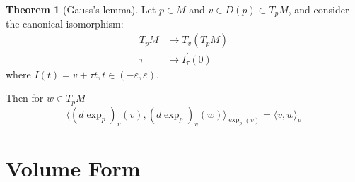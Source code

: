 \documentclass[12pt,a4paper]{book}
\newcommand{\p}{^{\prime}}
\theoremstyle{definition}
\newtheorem{theo}[defn]{Theorem}
\begin{document}
\begin{theo}[Gauss's lemma]
    Let $p\in M$ and $v\in D(p)\subset T_p M$, and consider the canonical isomorphism:
    \begin{align*}
        T_pM & \rightarrow T_v(T_pM) \\
        \tau & \mapsto I_{\tau}\p(0)
    \end{align*}
    where $I(t)=v+\tau t,t\in (-\varepsilon,\varepsilon)$.

    Then for $w\in T_pM$
    \begin{equation*}
        \langle (d\exp_p)_v(v),(d\exp_p)_v(w) \rangle_{\exp_p(v)} = \langle v,w\rangle_{p}
    \end{equation*}

\end{theo}

\section{Volume Form}
\end{document}
